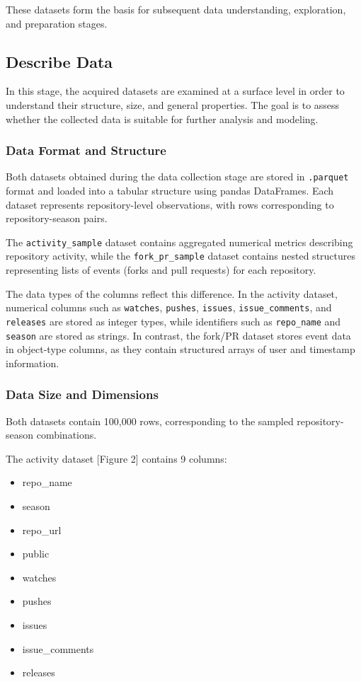 These datasets form the basis for subsequent data understanding, exploration, and preparation stages.



\subsection{Describe Data}

In this stage, the acquired datasets are examined at a surface level in order to understand their structure, size, and general properties. The goal is to assess whether the collected data is suitable for further analysis and modeling.

\subsubsection{Data Format and Structure}

Both datasets obtained during the data collection stage are stored in \texttt{.parquet} format and loaded into a tabular structure using pandas DataFrames. Each dataset represents repository-level observations, with rows corresponding to repository-season pairs.

The \texttt{activity\_sample} dataset contains aggregated numerical metrics describing repository activity, while the \texttt{fork\_pr\_sample} dataset contains nested structures representing lists of events (forks and pull requests) for each repository.

The data types of the columns reflect this difference. In the activity dataset, numerical columns such as \texttt{watches}, \texttt{pushes}, \texttt{issues}, \texttt{issue\_comments}, and \texttt{releases} are stored as integer types, while identifiers such as \texttt{repo\_name} and \texttt{season} are stored as strings. In contrast, the fork/PR dataset stores event data in object-type columns, as they contain structured arrays of user and timestamp information.

\subsubsection{Data Size and Dimensions}

Both datasets contain 100,000 rows, corresponding to the sampled repository-season combinations.

The activity dataset [Figure 2] contains 9 columns:
\begin{itemize}
    \item repo\_name
    \item season
    \item repo\_url
    \item public
    \item watches
    \item pushes
    \item issues
    \item issue\_comments
    \item releases
\end{itemize}

